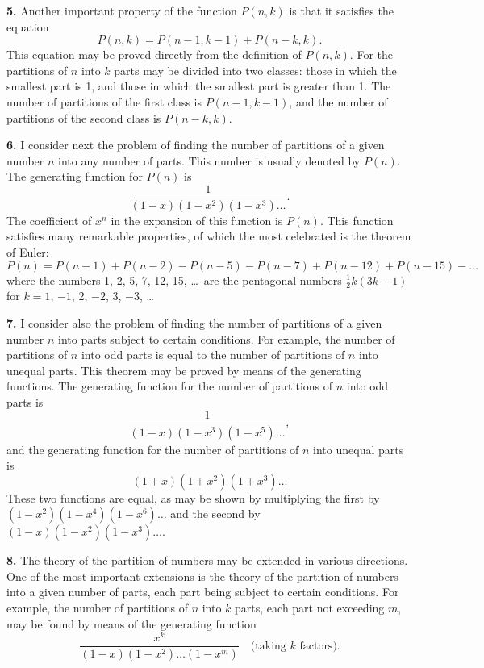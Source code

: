 \documentclass[11pt,a4paper]{book}
\begin{document}
\textbf{5.} Another important property of the function $P(n, k)$ is that it satisfies the equation
\[
P(n, k) = P(n-1, k-1) + P(n-k, k).
\]
This equation may be proved directly from the definition of $P(n, k)$. For the partitions of $n$ into $k$ parts may be divided into two classes: those in which the smallest part is 1, and those in which the smallest part is greater than 1. The number of partitions of the first class is $P(n-1, k-1)$, and the number of partitions of the second class is $P(n-k, k)$.

\newpage
\setcounter{page}{236}

\textbf{6.} I consider next the problem of finding the number of partitions of a given number $n$ into any number of parts. This number is usually denoted by $P(n)$. The generating function for $P(n)$ is
\[
\frac{1}{(1-x)(1-x^2)(1-x^3)\ldots}.
\]
The coefficient of $x^n$ in the expansion of this function is $P(n)$. This function satisfies many remarkable properties, of which the most celebrated is the theorem of Euler:
\[
P(n) = P(n-1) + P(n-2) - P(n-5) - P(n-7) + P(n-12) + P(n-15) - \ldots
\]
where the numbers 1, 2, 5, 7, 12, 15, \ldots\ are the pentagonal numbers $\frac{1}{2}k(3k-1)$ for $k = 1$, $-1$, 2, $-2$, 3, $-3$, \ldots

\textbf{7.} I consider also the problem of finding the number of partitions of a given number $n$ into parts subject to certain conditions. For example, the number of partitions of $n$ into odd parts is equal to the number of partitions of $n$ into unequal parts. This theorem may be proved by means of the generating functions. The generating function for the number of partitions of $n$ into odd parts is
\[
\frac{1}{(1-x)(1-x^3)(1-x^5)\ldots},
\]
and the generating function for the number of partitions of $n$ into unequal parts is
\[
(1+x)(1+x^2)(1+x^3)\ldots
\]
These two functions are equal, as may be shown by multiplying the first by $(1-x^2)(1-x^4)(1-x^6)\ldots$ and the second by $(1-x)(1-x^2)(1-x^3)\ldots$.

\newpage
\setcounter{page}{237}

\textbf{8.} The theory of the partition of numbers may be extended in various directions. One of the most important extensions is the theory of the partition of numbers into a given number of parts, each part being subject to certain conditions. For example, the number of partitions of $n$ into $k$ parts, each part not exceeding $m$, may be found by means of the generating function
\[
\frac{x^k}{(1-x)(1-x^2)\ldots(1-x^m)} \quad \text{(taking $k$ factors)}.
\]
\end{document}
